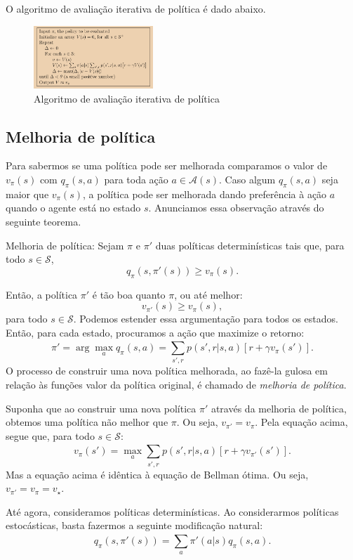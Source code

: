 \documentclass{article}
\begin{document}
O algoritmo de avaliação iterativa de política é dado abaixo.

\begin{figure}[htpb]
  \centering
  \includegraphics[width=0.4\textwidth]{fig4.1.png}
  \caption{Algoritmo de avaliação iterativa de política}
  \label{fig:}
\end{figure}

\newpage

\subsection{Melhoria de política}  
Para sabermos se uma política pode ser melhorada comparamos o valor de $v_{\pi}(s)$ com $q_{\pi}(s,a)$ para toda ação $a \in \mathcal{A}(s)$. Caso algum $q_{\pi}(s,a)$ seja maior que $v_{\pi}(s)$, a política pode ser melhorada dando preferência à ação $a$ quando o agente está no estado $s$. Anunciamos essa observação através do seguinte teorema.

Melhoria de política: Sejam $\pi$ e $\pi'$ duas políticas determinísticas tais que, para todo $s \in \mathcal{S}$,
\[
  q_{\pi}(s,\pi'(s)) \ge v_{\pi}(s)
.\] 

Então, a política $\pi'$ é tão boa quanto $\pi$, ou até melhor:
\[
  v_{\pi'}(s) \ge v_{\pi}(s)
,\] 
para todo $s \in \mathcal{S}$. Podemos estender essa argumentação para todos os estados. Então, para cada estado, procuramos a ação que maximize o retorno:
\[
  \pi'=\arg \max_{a} q_{\pi}(s,a)=\sum_{s',r}^{} p(s',r|s,a)[r+\gamma v_{\pi}(s')]
.\] 
O processo de construir uma nova política melhorada, ao fazê-la gulosa em relação às funções valor da política original, é chamado de \textit{melhoria de política}.

Suponha que ao construir uma nova política $\pi'$ através da melhoria de política, obtemos uma política não melhor que $\pi$. Ou seja, $v_{\pi'} = v_{\pi}$. Pela equação acima, segue que, para todo $s \in \mathcal{S}$:
\[
  v_{\pi}(s')=\max_{a} \sum_{s',r}^{} p(s',r|s,a)[r+\gamma v_{\pi'}(s')]
.\] 
Mas a equação acima é idêntica à equação de Bellman ótima. Ou seja, $v_{\pi'}=v_{\pi}=v_{\star}$. 

Até agora, consideramos políticas determinísticas. Ao considerarmos políticas estocásticas, basta fazermos a seguinte modificação natural:
\[
  q_{\pi}(s,\pi'(s))=\sum_{a}^{} \pi'(a|s)q_{\pi}(s,a)
.\] 
\end{document}
